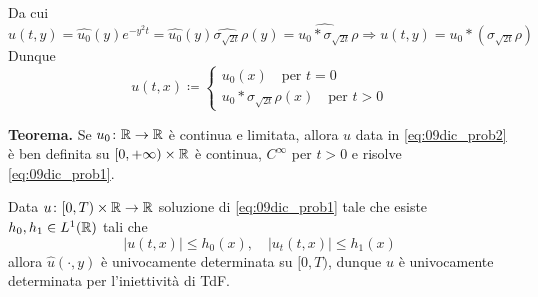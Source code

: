 Da cui
%
$$
	\hat{u}(t,y) = \hat{u_0} (y) e^{-y^2t} = \hat{u_0}(y) \hat{\sigma_{\sqrt{2t}}} \rho(y)
	= \hat{u_0 \ast \sigma_{\sqrt{2t}}} \rho
	\Longrightarrow u(t,y) = u_0 \ast \left( \sigma_{\sqrt{2t}} \rho \right)
$$
%
Dunque
%
\begin{equation}
\label{eq:09dic_prob2} \tag{$\ast$}
	u(t,x) \coloneqq 
	\begin{cases}
		u_0(x) \quad \text{per } t=0 \\
		u_0 \ast \sigma_{\sqrt{2t}} \rho(x) \quad \text{per } t > 0
	\end{cases} 
\end{equation}

\textbf{Teorema.} Se $u_0 \colon \mathbb R \to \mathbb R$ è continua e limitata, allora $u$ data in \eqref{eq:09dic_prob2} è ben definita su $[0,+\infty) \times \mathbb R$ è continua, $C^\infty$ per $t>0$ e risolve \eqref{eq:09dic_prob1}.

\vss

Data $u \colon [0,T) \times \mathbb R \to \mathbb R$ soluzione di \eqref{eq:09dic_prob1} tale che esiste $h_0,h_1 \in L^1(\mathbb R)$ tali che 
%
$$
	|u(t,x)| \leq h_0(x), \quad |u_t(t,x)| \leq h_1(x)
$$
%
allora $\hat{u}(\cdot,y)$ è univocamente determinata su $[0,T)$, dunque $u$ è univocamente determinata per l'iniettività di TdF.



